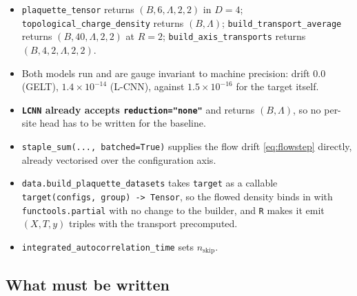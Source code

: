 \documentclass[11pt,a4paper]{article}
\begin{document}
\begin{itemize}
\item \texttt{plaquette\_tensor} returns $(B, 6, \Lambda, 2, 2)$ in $D=4$;
  \texttt{topological\_charge\_density} returns $(B, \Lambda)$;
  \texttt{build\_transport\_average} returns $(B, 40, \Lambda, 2, 2)$ at $R=2$;
  \texttt{build\_axis\_transports} returns $(B, 4, 2, \Lambda, 2, 2)$.
\item Both models run and are gauge invariant to machine precision: drift
  $0.0$ (GELT), $1.4\times 10^{-14}$ (L-CNN), against $1.5\times10^{-16}$ for the
  target itself.
\item \textbf{\texttt{LCNN} already accepts \texttt{reduction="none"}} and returns
  $(B, \Lambda)$, so no per-site head has to be written for the baseline.
\item \texttt{staple\_sum(..., batched=True)} supplies the flow drift
  \eqref{eq:flowstep} directly, already vectorised over the configuration axis.
\item \texttt{data.build\_plaquette\_datasets} takes \texttt{target} as a
  callable \texttt{target(configs, group) -> Tensor}, so the flowed density binds
  in with \texttt{functools.partial} with no change to the builder, and \texttt{R}
  makes it emit $(X, T, y)$ triples with the transport precomputed.
\item \texttt{integrated\_autocorrelation\_time} sets $n_{\mathrm{skip}}$.
\end{itemize}

\subsection{What must be written}
\end{document}
